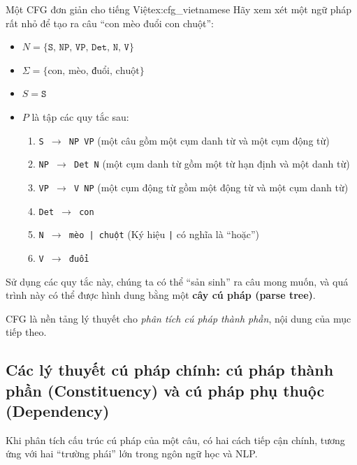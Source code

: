 \begin{example}{Một CFG đơn giản cho tiếng Việt}{ex:cfg_vietnamese}
    Hãy xem xét một ngữ pháp rất nhỏ để tạo ra câu “con mèo đuổi con chuột”:
    \begin{itemize}
        \item $N = \{ \texttt{S, NP, VP, Det, N, V} \}$
        \item $\Sigma = \{ \text{con, mèo, đuổi, chuột} \}$
        \item $S = \texttt{S}$
        \item $P$ là tập các quy tắc sau:
            \begin{enumerate}
                \item \texttt{S $\rightarrow$ NP VP} (một câu gồm một cụm danh từ và một cụm động từ)
                \item \texttt{NP $\rightarrow$ Det N} (một cụm danh từ gồm một từ hạn định và một danh từ)
                \item \texttt{VP $\rightarrow$ V NP} (một cụm động từ gồm một động từ và một cụm danh từ)
                \item \texttt{Det $\rightarrow$ con}
                \item \texttt{N $\rightarrow$ mèo | chuột} (Ký hiệu \texttt{|} có nghĩa là “hoặc”)
                \item \texttt{V $\rightarrow$ đuổi}
            \end{enumerate}
    \end{itemize}
    Sử dụng các quy tắc này, chúng ta có thể “sản sinh” ra câu mong muốn, và quá trình này có thể được hình dung bằng một \textbf{cây cú pháp (parse tree)}.
\end{example}

CFG là nền tảng lý thuyết cho \textit{phân tích cú pháp thành phần}, nội dung của mục tiếp theo.

\subsection{Các lý thuyết cú pháp chính: cú pháp thành phần (Constituency) và cú pháp phụ thuộc (Dependency)}
\label{ssec:constituency_dependency}

Khi phân tích cấu trúc cú pháp của một câu, có hai cách tiếp cận chính, tương ứng với hai “trường phái” lớn trong ngôn ngữ học và NLP.

